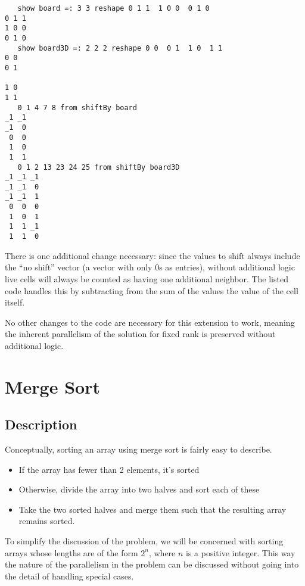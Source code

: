 \begin{singlespacing}
\begin{small}
\begin{verbatim}
   show board =: 3 3 reshape 0 1 1  1 0 0  0 1 0
0 1 1
1 0 0
0 1 0
   show board3D =: 2 2 2 reshape 0 0  0 1  1 0  1 1
0 0
0 1

1 0
1 1
   0 1 4 7 8 from shiftBy board
_1 _1
_1  0
 0  0
 1  0
 1  1
   0 1 2 13 23 24 25 from shiftBy board3D
_1 _1 _1
_1 _1  0
_1 _1  1
 0  0  0
 1  0  1
 1  1 _1
 1  1  0
\end{verbatim}
\end{small}
\end{singlespacing}

There is one additional change necessary:
since the values to shift always include the ``no shift'' vector
(a vector with only 0s as entries),
without additional logic live cells will always be counted as 
having one additional neighbor. 
The listed code handles this by subtracting from 
the sum of the values the value of the cell itself.

No other changes to the code are necessary for this extension to work, 
meaning the inherent parallelism of the solution for fixed rank 
is preserved without additional logic.

\section{Merge Sort}
\label{mgdes}
\subsection{Description}
Conceptually, sorting an array using merge sort is fairly easy to describe.

\begin{itemize}
	\item If the array has fewer than 2 elements, it's sorted
	\item Otherwise, divide the array into two halves and sort each of these
	\item Take the two sorted halves and merge them such that the resulting array remains sorted.
\end{itemize}

To simplify the discussion of the problem, 
we will be concerned with sorting arrays 
whose lengths are of the form $2^n$, where $n$ is a positive integer.
This way the nature of the parallelism in the problem can be discussed 
without going into the detail of handling special cases.

